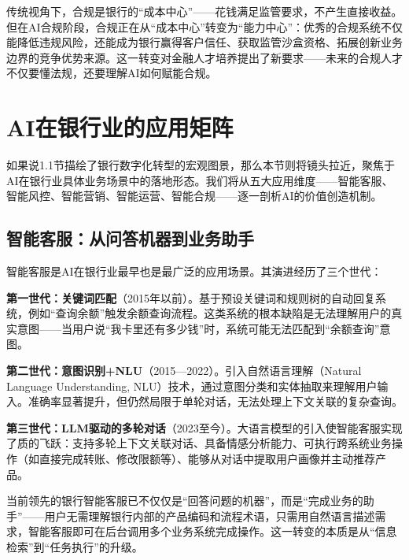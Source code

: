 \begin{theorybox}[从合规成本到合规能力]
传统视角下，合规是银行的``成本中心''——花钱满足监管要求，不产生直接收益。但在AI合规阶段，合规正在从``成本中心''转变为``能力中心''：优秀的合规系统不仅能降低违规风险，还能成为银行赢得客户信任、获取监管沙盒资格、拓展创新业务边界的竞争优势来源。这一转变对金融人才培养提出了新要求——未来的合规人才不仅要懂法规，还要理解AI如何赋能合规。
\end{theorybox}


\section{AI在银行业的应用矩阵}

如果说1.1节描绘了银行数字化转型的宏观图景，那么本节则将镜头拉近，聚焦于AI在银行业具体业务场景中的落地形态。我们将从五大应用维度——智能客服、智能风控、智能营销、智能运营、智能合规——逐一剖析AI的价值创造机制。

\subsection{智能客服：从问答机器到业务助手}

智能客服是AI在银行业最早也是最广泛的应用场景。其演进经历了三个世代：

\textbf{第一世代：关键词匹配}（2015年以前）。基于预设关键词和规则树的自动回复系统，例如``查询余额''触发余额查询流程。这类系统的根本缺陷是无法理解用户的真实意图——当用户说``我卡里还有多少钱''时，系统可能无法匹配到``余额查询''意图。

\textbf{第二世代：意图识别+NLU}（2015—2022）。引入自然语言理解（Natural Language Understanding, NLU）技术，通过意图分类和实体抽取来理解用户输入。准确率显著提升，但仍然局限于单轮对话，无法处理上下文关联的复杂查询。

\textbf{第三世代：LLM驱动的多轮对话}（2023至今）。大语言模型的引入使智能客服实现了质的飞跃：支持多轮上下文关联对话、具备情感分析能力、可执行跨系统业务操作（如直接完成转账、修改限额等）、能够从对话中提取用户画像并主动推荐产品。

当前领先的银行智能客服已不仅仅是``回答问题的机器''，而是``完成业务的助手''——用户无需理解银行内部的产品编码和流程术语，只需用自然语言描述需求，智能客服即可在后台调用多个业务系统完成操作。这一转变的本质是从``信息检索''到``任务执行''的升级。

